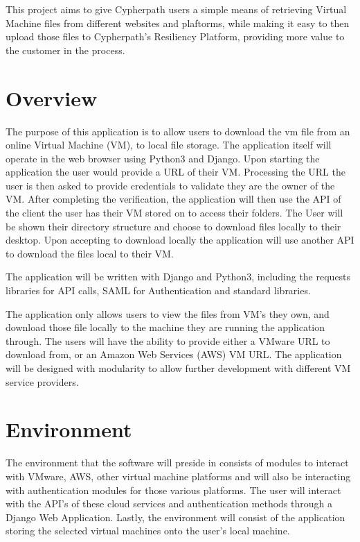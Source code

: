 \documentclass{article}
\begin{document}
	This project aims to give Cypherpath users a simple means of retrieving Virtual Machine files from different websites and plaftorms, while making it easy to 
	then upload those files to Cypherpath's Resiliency Platform, providing more value to the customer in the process.


    \section{Overview}
    The purpose of this application is to allow users to download the vm file from an online Virtual Machine (VM), to local file storage.
    The application itself will operate in the web browser using Python3 and Django. Upon starting the application the user would
    provide a URL of their VM. Processing the URL the user is then asked to provide credentials to validate they are the owner of
    the VM. After completing the verification, the application will then use the API of the client the user has their VM stored on
    to access their folders. The User will be shown their directory structure and choose to download files locally to their desktop.
    Upon accepting to download locally the application will use another API to download the files local to their VM.

    The application will be written with Django and Python3, including the requests libraries for API calls, SAML for Authentication
    and standard libraries.

    The application only allows users to view the files from VM's they own, and download those file locally to the machine they 
    are running the application through. The users will have the ability to provide either a VMware URL to download from, or an
    Amazon Web Services (AWS) VM URL. The application will be designed with modularity to allow further 
    development with different VM service providers.  


    \section{Environment}

    The environment that the software will preside in consists of modules to interact with VMware, 
    AWS, other virtual machine platforms and will also be interacting with authentication modules for those
    various platforms. The user will interact with the API's of these cloud services and authentication
    methods through a Django Web Application. Lastly, the environment will consist of the application storing the selected
    virtual machines onto the user's local machine.
\end{document}
